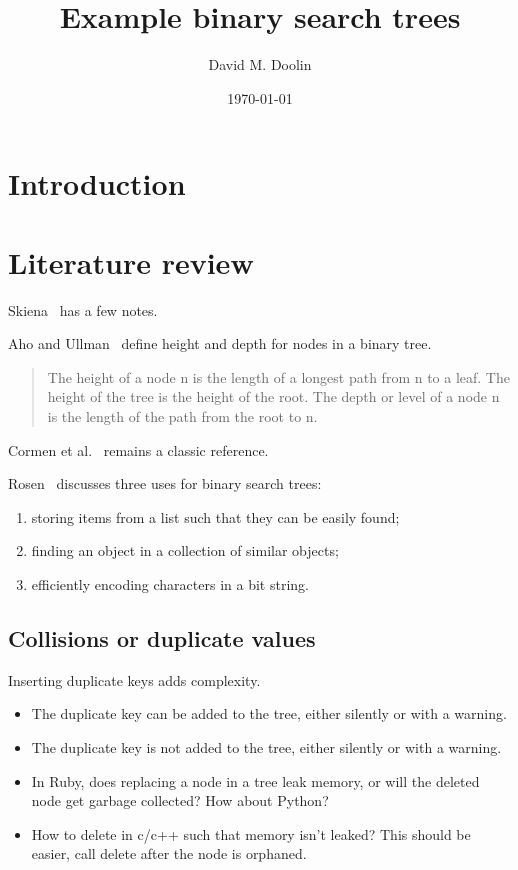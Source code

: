 \documentclass{article}
\title{Example binary search trees}
\date{\today}
\author{David M. Doolin}
\begin{document}
\maketitle




\section{Introduction}


\section{Literature review}

Skiena~\cite[pp. 77, 370, 375, 589]{skiena} has a few notes.

Aho and Ullman~\cite[pp. 210]{rosen} define height and depth for nodes in a binary tree.

\begin{quote}
The height of a node n is the length of a longest path from n to
a leaf. The height of the tree is the height of the root. The depth or level of
a node n is the length of the path from the root to n.
\end{quote}

Cormen et al.~\cite{cormen:th:1990} remains a classic reference.

Rosen~\cite[pp. 757-760]{rosen} discusses three uses for binary search trees:

\begin{enumerate}
\item storing items from a list such that they can be easily found;
\item finding an object in a collection of similar objects;
\item efficiently encoding characters in a bit string.
\end{enumerate}

\subsection{Collisions or duplicate values}

Inserting duplicate keys adds complexity.

\begin{itemize}
\item The duplicate key can be added to the tree, either silently or with a warning.
\item The duplicate key is not added to the tree, either silently or with a warning.

\item In Ruby, does replacing a node in a tree leak memory, or will the deleted node
get garbage collected? How about Python?

\item How to delete in c/c++ such that memory isn't leaked? This should be easier,
call delete after the node is orphaned.
\end{itemize}
\end{document}
